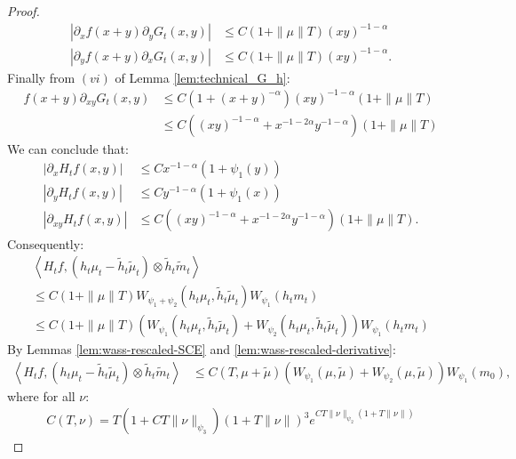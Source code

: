 \documentclass[11pt,a4paper]{article}
\newcommand{\brac}[1]{\left\langle#1\right\rangle}
\begin{document}
\begin{proof}
    \begin{align*}
        \left| \partial_x f(x+y) \partial_yG_t(x,y) \right| &\leq C(1 + \|\mu\|T) (xy)^{-1-\alpha} \\
        \left| \partial_y f(x+y) \partial_xG_t(x,y) \right| &\leq C(1 + \|\mu\|T) (xy)^{-1-\alpha}.
    \end{align*}
    Finally from $(vi)$ of Lemma \ref{lem:technical_G_h}:
    \begin{align*}
        f(x+y )\partial_{xy} G_t(x,y) 
        &\leq C (1 + (x+y)^{-\alpha})(xy)^{-1-\alpha} \left(1 + \|\mu\|T\right) \\
        &\leq C \left((xy)^{-1-\alpha} + x^{-1-2\alpha}y^{-1-\alpha} \right)\left(1 + \|\mu\|T\right)
    \end{align*}
    We can conclude that:
    \begin{align*}
        \left|\partial_x H_tf(x,y)\right| &\leq C x^{-1-\alpha} (1 + \psi_1(y)) \\
        \left|\partial_y H_tf(x,y)\right| &\leq C y^{-1-\alpha} (1 + \psi_1(x)) \\
        \left|\partial_{xy}H_tf(x,y) \right| &\leq  C \left((xy)^{-1-\alpha} + x^{-1-2\alpha}y^{-1-\alpha} \right)\left(1 + \|\mu\|T\right).
    \end{align*}
    Consequently:
    \begin{multline*}
        \brac{H_tf,\left(h_t\mu_t - \tilde{h}_t\tilde{\mu}_t\right)\otimes \tilde{h}_t\tilde{m}_t} \\
        \leq C\left(1 + \|\mu\|T\right)W_{\psi_1 + \psi_2}\left( h_t\mu_t , \tilde{h}_t\tilde{\mu}_t\right)W_{\psi_1}\left(h_t m_t \right) \\
        \leq C\left(1 + \|\mu\|T\right)\left(W_{\psi_1}\left( h_t\mu_t , \tilde{h}_t\tilde{\mu}_t\right) + W_{\psi_2}\left( h_t\mu_t , \tilde{h}_t\tilde{\mu}_t\right)\right)W_{\psi_1}\left(h_t m_t \right)
    \end{multline*}
    By Lemmas \ref{lem:wass-rescaled-SCE} and \ref{lem:wass-rescaled-derivative}:
    \begin{align*}
        \brac{H_tf,\left(h_t\mu_t - \tilde{h}_t\tilde{\mu}_t\right)\otimes \tilde{h}_t\tilde{m}_t}  
        &\leq C(T,\mu + \tilde{\mu})\left(W_{\psi_1}\left( \mu , \tilde{\mu}\right) + W_{\psi_2}\left( \mu , \tilde{\mu}\right)\right)W_{\psi_1}\left(m_0\right),
    \end{align*}
    where for all $ \nu$:
    \begin{align*}
        C(T,\nu) = T(1 + CT\|\nu\|_{\psi_3})(1 + T\|\nu\|)^3 e^{CT\|\nu\|_{\psi_2}\left(1 + T\|\nu\|\right)}

\end{align*}
\end{proof}
\end{document}
